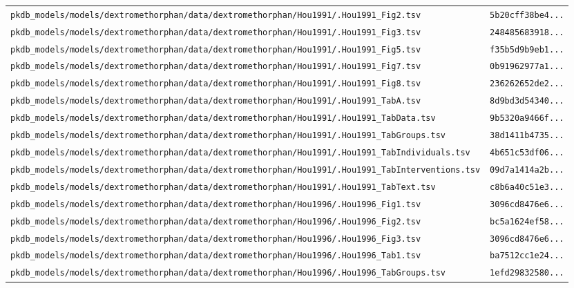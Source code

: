 \begin{longtable}{ll}
\texttt{pkdb\_models/models/dextromethorphan/data/dextromethorphan/Hou1991/.Hou1991\_Fig2.tsv} & \texttt{5b20cff38be4...} \\
\texttt{pkdb\_models/models/dextromethorphan/data/dextromethorphan/Hou1991/.Hou1991\_Fig3.tsv} & \texttt{248485683918...} \\
\texttt{pkdb\_models/models/dextromethorphan/data/dextromethorphan/Hou1991/.Hou1991\_Fig5.tsv} & \texttt{f35b5d9b9eb1...} \\
\texttt{pkdb\_models/models/dextromethorphan/data/dextromethorphan/Hou1991/.Hou1991\_Fig7.tsv} & \texttt{0b91962977a1...} \\
\texttt{pkdb\_models/models/dextromethorphan/data/dextromethorphan/Hou1991/.Hou1991\_Fig8.tsv} & \texttt{236262652de2...} \\
\texttt{pkdb\_models/models/dextromethorphan/data/dextromethorphan/Hou1991/.Hou1991\_TabA.tsv} & \texttt{8d9bd3d54340...} \\
\texttt{pkdb\_models/models/dextromethorphan/data/dextromethorphan/Hou1991/.Hou1991\_TabData.tsv} & \texttt{9b5320a9466f...} \\
\texttt{pkdb\_models/models/dextromethorphan/data/dextromethorphan/Hou1991/.Hou1991\_TabGroups.tsv} & \texttt{38d1411b4735...} \\
\texttt{pkdb\_models/models/dextromethorphan/data/dextromethorphan/Hou1991/.Hou1991\_TabIndividuals.tsv} & \texttt{4b651c53df06...} \\
\texttt{pkdb\_models/models/dextromethorphan/data/dextromethorphan/Hou1991/.Hou1991\_TabInterventions.tsv} & \texttt{09d7a1414a2b...} \\
\texttt{pkdb\_models/models/dextromethorphan/data/dextromethorphan/Hou1991/.Hou1991\_TabText.tsv} & \texttt{c8b6a40c51e3...} \\
\texttt{pkdb\_models/models/dextromethorphan/data/dextromethorphan/Hou1996/.Hou1996\_Fig1.tsv} & \texttt{3096cd8476e6...} \\
\texttt{pkdb\_models/models/dextromethorphan/data/dextromethorphan/Hou1996/.Hou1996\_Fig2.tsv} & \texttt{bc5a1624ef58...} \\
\texttt{pkdb\_models/models/dextromethorphan/data/dextromethorphan/Hou1996/.Hou1996\_Fig3.tsv} & \texttt{3096cd8476e6...} \\
\texttt{pkdb\_models/models/dextromethorphan/data/dextromethorphan/Hou1996/.Hou1996\_Tab1.tsv} & \texttt{ba7512cc1e24...} \\
\texttt{pkdb\_models/models/dextromethorphan/data/dextromethorphan/Hou1996/.Hou1996\_TabGroups.tsv} & \texttt{1efd29832580...} \\

\end{longtable}
